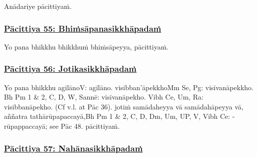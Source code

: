 Anādariye pācittiyaṁ.



\subsubsection*{\hyperref[exp55]{Pācittiya 55: Bhiṁsāpanasikkhāpadaṁ}}
\label{pac55}

Yo pana bhikkhu bhikkhuṁ bhiṁsāpeyya, pācittiyaṁ.



\subsubsection*{\hyperref[exp56]{Pācittiya 56: Jotikasikkhāpadaṁ}}
\label{pac56}

Yo pana bhikkhu agilāno\makeatletter\hyperlink{endnote-appendix}\makeatother V: agīlāno. visibban'āpekkho\makeatletter\hyperlink{endnote-appendix}\makeatother Mm Se, Pg: visīvanāpekkho. Bh Pm 1 & 2, C, D, W, Sannē: visīvanāpekho. Vibh Ce, Um, Ra: visibbanāpekho. (Cf v.l. at Pāc 36). jotiṁ samādaheyya vā samādahāpeyya vā, aññatra tathārūpapaccayā,\makeatletter\hyperlink{endnote-appendix}\makeatother Bh Pm 1 & 2, C, D, Dm, Um, UP, V, Vibh Ce: -rūpappaccayā; see Pāc 48. pācittiyaṁ.



\subsubsection*{\hyperref[exp57]{Pācittiya 57: Nahānasikkhāpadaṁ}}
\label{pac57}

